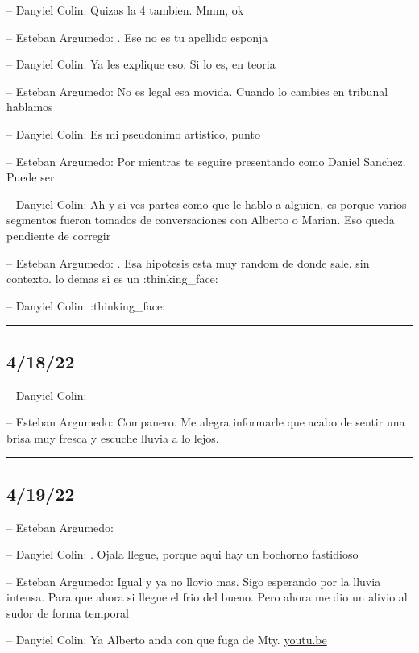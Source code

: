 -- Danyiel Colin: Quizas la 4 tambien. Mmm, ok

-- Esteban Argumedo: . Ese no es tu apellido esponja

-- Danyiel Colin: Ya les explique eso. Si lo es, en teoria

-- Esteban Argumedo: No es legal esa movida. Cuando lo cambies en
tribunal hablamos

-- Danyiel Colin: Es mi pseudonimo artistico, punto

-- Esteban Argumedo: Por mientras te seguire presentando como Daniel
Sanchez. Puede ser

-- Danyiel Colin: Ah y si ves partes como que le hablo a alguien, es
porque varios segmentos fueron tomados de conversaciones con Alberto o
Marian. Eso queda pendiente de corregir

-- Esteban Argumedo: . Esa hipotesis esta muy random de donde sale. sin
contexto. lo demas si es un :thinking\_face:

-- Danyiel Colin: :thinking\_face:

\begin{center}\rule{0.5\linewidth}{0.5pt}\end{center}

\hypertarget{section-56}{%
\subsection{4/18/22}\label{section-56}}

-- Danyiel Colin:

-- Esteban Argumedo: Companero. Me alegra informarle que acabo de sentir
una brisa muy fresca y escuche lluvia a lo lejos.

\begin{center}\rule{0.5\linewidth}{0.5pt}\end{center}

\hypertarget{section-57}{%
\subsection{4/19/22}\label{section-57}}

-- Esteban Argumedo:

-- Danyiel Colin: . Ojala llegue, porque aqui hay un bochorno fastidioso

-- Esteban Argumedo: Igual y ya no llovio mas. Sigo esperando por la
lluvia intensa. Para que ahora si llegue el frio del bueno. Pero ahora
me dio un alivio al sudor de forma temporal

-- Danyiel Colin: Ya Alberto anda con que fuga de Mty.
\href{https://youtu.be/EY75EeIZCFE}{youtu.be}

